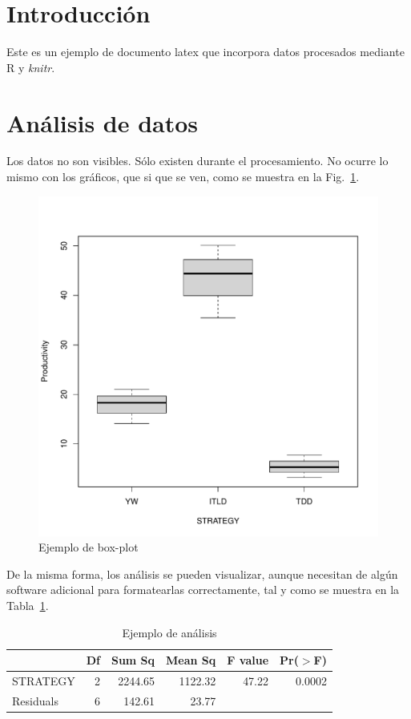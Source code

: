 \documentclass{article}\usepackage[]{graphicx}\usepackage[]{color}
\newenvironment{knitrout}{}{} %
\begin{document}
\section{Introducci\'on}

Este es un ejemplo de documento latex que incorpora datos procesados mediante R y \textit{knitr}.

\section{An\'alisis de datos}



Los datos no son visibles. S\'olo existen durante el procesamiento. No ocurre lo mismo con los gr\'aficos, que si que se ven, como se muestra en la Fig.~\ref{fig1}.

\begin{figure}[h]
\centering
\begin{knitrout}
\color{fgcolor}
\includegraphics[width=0.5\linewidth]{figure/boxplot-1} 

\end{knitrout}
\caption{Ejemplo de box-plot}
\label{fig1}
\end{figure}

De la misma forma, los an\'alisis se pueden visualizar, aunque necesitan de alg\'un software adicional para formatearlas correctamente, tal y como se muestra en la Tabla~\ref{tab1}.

\begin{table}[ht]
\centering
\begin{tabular}{lrrrrr}
  \hline
 & Df & Sum Sq & Mean Sq & F value & Pr($>$F) \\ 
  \hline
STRATEGY    & 2 & 2244.65 & 1122.32 & 47.22 & 0.0002 \\ 
  Residuals   & 6 & 142.61 & 23.77 &  &  \\ 
   \hline
\end{tabular}
\caption{Ejemplo de an\'alisis} 
\label{tab1}
\end{table}
\end{document}
